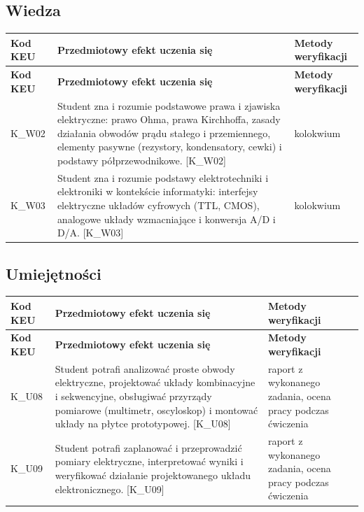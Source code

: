 \documentclass[12pt, a4paper]{article}
\newcommand{\thdrule}{\noalign{\global\setlength{\extrarowheight}{0pt}}}
\newcommand{\thdend}{\noalign{\global\setlength{\extrarowheight}{3pt}}}
\begin{document}
\subsection*{Wiedza}
{\scriptsize
\begin{longtable}{m{1.6cm}m{9.0cm}m{4.2cm}}
\thdrule\toprule
\rowcolor{pjatkRed} {\color{white}\footnotesize\textbf{\vphantom{Ag}Kod KEU}} & {\color{white}\footnotesize\textbf{\vphantom{Ag}Przedmiotowy efekt uczenia się}} & {\color{white}\footnotesize\textbf{\vphantom{Ag}Metody weryfikacji}} \\
\midrule\thdend
\endfirsthead
\thdrule\toprule
\rowcolor{pjatkRed} {\color{white}\footnotesize\textbf{\vphantom{Ag}Kod KEU}} & {\color{white}\footnotesize\textbf{\vphantom{Ag}Przedmiotowy efekt uczenia się}} & {\color{white}\footnotesize\textbf{\vphantom{Ag}Metody weryfikacji}} \\
\midrule\thdend
\endhead
  \rowcolor{tableRowLight} K\_W02 & Student zna i rozumie podstawowe prawa i zjawiska elektryczne: prawo Ohma, prawa Kirchhoffa, zasady działania obwodów prądu stałego i przemiennego, elementy pasywne (rezystory, kondensatory, cewki) i podstawy półprzewodnikowe. {[}K\_W02{]} & kolokwium \\
  \rowcolor{tableRowAlt} K\_W03 & Student zna i rozumie podstawy elektrotechniki i elektroniki w kontekście informatyki: interfejsy elektryczne układów cyfrowych (TTL, CMOS), analogowe układy wzmacniające i konwersja A/D i D/A. {[}K\_W03{]} & kolokwium \\
\bottomrule
\end{longtable}}

\subsection*{Umiejętności}
{\scriptsize
\begin{longtable}{m{1.6cm}m{9.0cm}m{4.2cm}}
\thdrule\toprule
\rowcolor{pjatkRed} {\color{white}\footnotesize\textbf{\vphantom{Ag}Kod KEU}} & {\color{white}\footnotesize\textbf{\vphantom{Ag}Przedmiotowy efekt uczenia się}} & {\color{white}\footnotesize\textbf{\vphantom{Ag}Metody weryfikacji}} \\
\midrule\thdend
\endfirsthead
\thdrule\toprule
\rowcolor{pjatkRed} {\color{white}\footnotesize\textbf{\vphantom{Ag}Kod KEU}} & {\color{white}\footnotesize\textbf{\vphantom{Ag}Przedmiotowy efekt uczenia się}} & {\color{white}\footnotesize\textbf{\vphantom{Ag}Metody weryfikacji}} \\
\midrule\thdend
\endhead
  \rowcolor{tableRowLight} K\_U08 & Student potrafi analizować proste obwody elektryczne, projektować układy kombinacyjne i sekwencyjne, obsługiwać przyrządy pomiarowe (multimetr, oscyloskop) i montować układy na płytce prototypowej. {[}K\_U08{]} & raport z wykonanego zadania, ocena pracy podczas ćwiczenia \\
  \rowcolor{tableRowAlt} K\_U09 & Student potrafi zaplanować i przeprowadzić pomiary elektryczne, interpretować wyniki i weryfikować działanie projektowanego układu elektronicznego. {[}K\_U09{]} & raport z wykonanego zadania, ocena pracy podczas ćwiczenia \\
\bottomrule
\end{longtable}}
\end{document}
